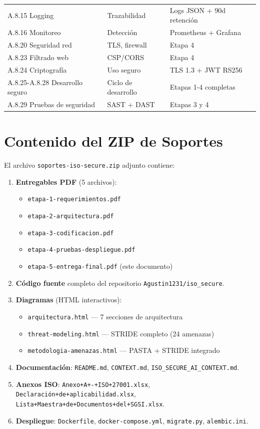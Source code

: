 \documentclass[12pt,a4paper,oneside]{article}
\begin{document}
\begin{longtable}{p{2.5cm}p{4cm}p{7.5cm}}
A.8.15 Logging & Trazabilidad & Logs JSON + 90d retención \\
A.8.16 Monitoreo & Detección & Prometheus + Grafana \\
A.8.20 Seguridad red & TLS, firewall & Etapa 4 \\
A.8.23 Filtrado web & CSP/CORS & Etapa 4 \\
A.8.24 Criptografía & Uso seguro & TLS 1.3 + JWT RS256 \\
A.8.25-A.8.28 Desarrollo seguro & Ciclo de desarrollo & Etapas 1-4 completas \\
A.8.29 Pruebas de seguridad & SAST + DAST & Etapas 3 y 4 \\
\bottomrule
\end{longtable}

\section{Contenido del ZIP de Soportes}

El archivo \texttt{soportes-iso-secure.zip} adjunto contiene:

\begin{enumerate}[leftmargin=*]
  \item \textbf{Entregables PDF} (5 archivos):
  \begin{itemize}
    \item \texttt{etapa-1-requerimientos.pdf}
    \item \texttt{etapa-2-arquitectura.pdf}
    \item \texttt{etapa-3-codificacion.pdf}
    \item \texttt{etapa-4-pruebas-despliegue.pdf}
    \item \texttt{etapa-5-entrega-final.pdf} (este documento)
  \end{itemize}
  \item \textbf{Código fuente} completo del repositorio \texttt{Agustin1231/iso\_secure}.
  \item \textbf{Diagramas} (HTML interactivos):
  \begin{itemize}
    \item \texttt{arquitectura.html} — 7 secciones de arquitectura
    \item \texttt{threat-modeling.html} — STRIDE completo (24 amenazas)
    \item \texttt{metodologia-amenazas.html} — PASTA + STRIDE integrado
  \end{itemize}
  \item \textbf{Documentación}: \texttt{README.md}, \texttt{CONTEXT.md}, \texttt{ISO\_SECURE\_AI\_CONTEXT.md}.
  \item \textbf{Anexos ISO}: \texttt{Anexo+A+-+ISO+27001.xlsx}, \texttt{Declaración+de+aplicabilidad.xlsx}, \texttt{Lista+Maestra+de+Documentos+del+SGSI.xlsx}.
  \item \textbf{Despliegue}: \texttt{Dockerfile}, \texttt{docker-compose.yml}, \texttt{migrate.py}, \texttt{alembic.ini}.
\end{enumerate}
\end{document}
